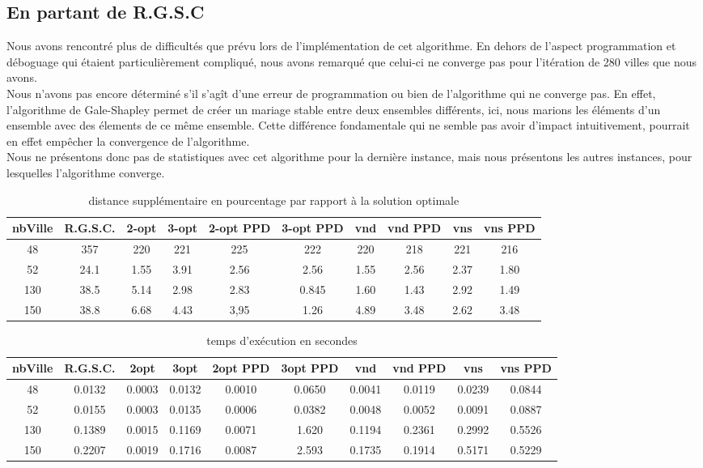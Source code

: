\documentclass[12pt,a4paper]{article}
\begin{document}
\subsection{En partant de R.G.S.C}
Nous avons rencontré plus de difficultés que prévu lors de l'implémentation de cet algorithme. En dehors de l'aspect programmation et déboguage qui étaient particulièrement compliqué, nous avons remarqué que celui-ci ne converge pas pour l'itération de 280 villes que nous avons.\\
Nous n'avons pas encore déterminé s'il s'agît d'une erreur de programmation ou bien de l'algorithme qui ne converge pas. En effet, l'algorithme de Gale-Shapley permet de créer un mariage stable entre deux ensembles différents, ici, nous marions les éléments d'un ensemble avec des élements de ce même ensemble. Cette différence fondamentale qui ne semble pas avoir d'impact intuitivement, pourrait en effet empêcher la convergence de l'algorithme.\\
Nous ne présentons donc pas de statistiques avec cet algorithme pour la dernière instance, mais nous présentons les autres instances, pour lesquelles l'algorithme converge.\\
\begin{table}[!h]
\centering
\begin{tabular}{|*{10}{c|}}
  \hline
  nbVille & R.G.S.C. & 2-opt & 3-opt & 2-opt PPD & 3-opt PPD & vnd & vnd PPD & vns & vns PPD \\
  \hline
  48 & 357 & 220 & 221 & 225 & 222 & 220 & 218 & 221 & 216 \\
  52 & 24.1 & 1.55 & 3.91 & 2.56 & 2.56 & 1.55 & 2.56 & 2.37 & 1.80 \\
  130 & 38.5 & 5.14 & 2.98 & 2.83 & 0.845 & 1.60 & 1.43 & 2.92 & 1.49 \\
  150 & 38.8 & 6.68 & 4.43 & 3,95 & 1.26 & 4.89 & 3.48 & 2.62 & 3.48 \\
  \hline
\end{tabular}
\caption{distance supplémentaire en pourcentage par rapport à la solution optimale}
\label{RGSCpourcentageperf}
\end{table}

\begin{table}[!h]
\centering
\begin{tabular}{|*{10}{c|}}
  \hline
  nbVille & R.G.S.C. & 2opt & 3opt & 2opt PPD & 3opt PPD & vnd & vnd PPD & vns & vns PPD \\
  \hline
  48 & 0.0132 & 0.0003 & 0.0132 & 0.0010 & 0.0650 & 0.0041 & 0.0119 & 0.0239 & 0.0844 \\
  52 & 0.0155 & 0.0003 & 0.0135 & 0.0006 & 0.0382 & 0.0048 & 0.0052 & 0.0091 & 0.0887 \\
  130 & 0.1389 & 0.0015 & 0.1169 & 0.0071 & 1.620 & 0.1194 & 0.2361 & 0.2992 & 0.5526 \\
  150 & 0.2207 & 0.0019 & 0.1716 & 0.0087 & 2.593 & 0.1735 & 0.1914 & 0.5171 & 0.5229 \\
  \hline
\end{tabular}
\caption{temps d’exécution en secondes}
\label{RGSCtemps}
\end{table}
\end{document}
